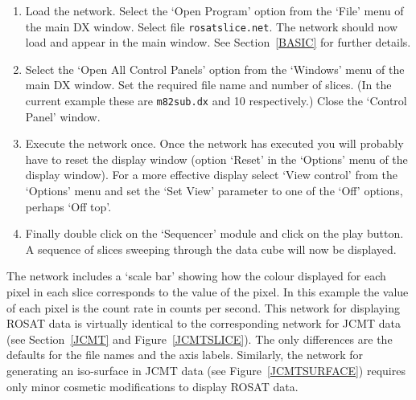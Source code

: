 \documentclass[twoside,11pt]{starlink}
\begin{document}
\begin{enumerate}
\begin{figure}[htbp]
  \end{figure}

  \begin{enumerate}

    \item Load the network.  Select the `Open Program' option from the
     `File' menu of the main DX window.  Select file \texttt{rosatslice.net}.  The network should now load and appear in the
     main window.  See Section~\ref{BASIC} for further details.

    \item Select the `Open All Control Panels' option from the `Windows'
     menu of the main DX window.  Set the required file name and
     number of slices.  (In the current example these are \texttt{m82sub.dx}
     and 10 respectively.)  Close the `Control Panel' window.

    \item Execute the network once.  Once the network has executed you
     will probably have to reset the display window (option `Reset' in
     the `Options' menu of the display window).  For a more effective
     display select `View control' from the `Options' menu and set the
     `Set View' parameter to one of the `Off' options, perhaps `Off top'.

    \item Finally double click on the `Sequencer' module and click on
     the play button.  A sequence of slices sweeping through the data
     cube will now be displayed.

  \end{enumerate}

   The network includes a `scale bar' showing how the colour displayed
   for each pixel in each slice corresponds to the value of the pixel.
   In this example the value of each pixel is the count rate in counts
   per second.  This network for displaying ROSAT data is virtually
   identical to the corresponding network for JCMT data (see
   Section~\ref{JCMT} and Figure~\ref{JCMTSLICE}).  The only differences
   are the defaults for the file names and the axis labels.  Similarly,
   the network for generating an iso-surface in JCMT data (see
   Figure~\ref{JCMTSURFACE}) requires only minor cosmetic modifications
   to display ROSAT data.

\end{enumerate}


\cleardoublepage
\end{document}
